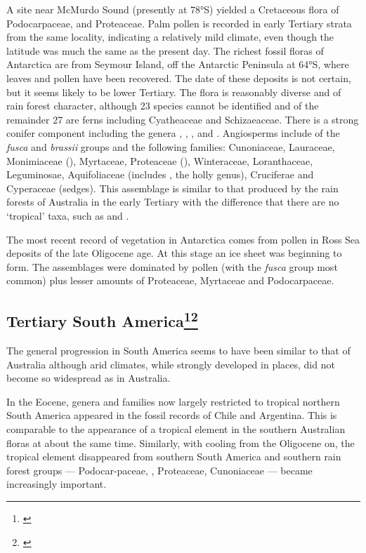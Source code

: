 A site near McMurdo Sound (presently at \ang{78}S) yielded a Cretaceous flora of Podocarpaceae,  and Proteaceae.
Palm pollen is recorded in early Tertiary strata from the same locality, indicating a relatively mild climate, even though the latitude was much the same as the present day.
The richest fossil floras of Antarctica are from Seymour Island, off the Antarctic Peninsula at \ang{64}S, where leaves and pollen have been recovered.
The date of these deposits is not certain, but it seems likely to be lower Tertiary.
The flora is reasonably diverse and of rain forest character, although 23 species cannot be identified and of the remainder 27 are ferns including Cyatheaceae and Schizaeaceae.
There is a strong conifer component including the genera , , ,  and .
Angiosperms include  of the \emph{fusca} and \emph{brassii} groups and the following families: Cunoniaceae, Lauraceae, Monimiaceae (), Myrtaceae, Proteaceae (), Winteraceae, Loranthaceae, Leguminosae, Aquifoliaceae (includes , the holly genus), Cruciferae and Cyperaceae (sedges).
This assemblage is similar to that produced by the rain forests of Australia in the early Tertiary with the difference that there are no `tropical' taxa, such as  and .

The most recent record of vegetation in Antarctica comes from pollen in Ross Sea deposits of the late Oligocene age.
At this stage an ice sheet was beginning to form.
The assemblages were dominated by  pollen (with the \emph{fusca} group most common) plus lesser amounts of Proteaceae, Myrtaceae and Podocarpaceae.

\subsection[Tertiary South America]{Tertiary South America\thinspace\footnote{\cite{wace1965vascular}}\footnote{\cite{kemp1978tertiary}}}

The general progression in South America seems to have been similar to that of Australia although arid climates, while strongly developed in places, did not become so widespread as in Australia.

In the Eocene, genera and families now largely restricted to tropical northern South America appeared in the fossil records of Chile and Argentina.
This is comparable to the appearance of a tropical element in the southern Australian floras at about the same time.
Similarly, with cooling from the Oligocene on, the tropical element disappeared from southern South America and southern rain forest groups --- Podocar-paceae, , Proteaceae, Cunoniaceae --- became increasingly important.

